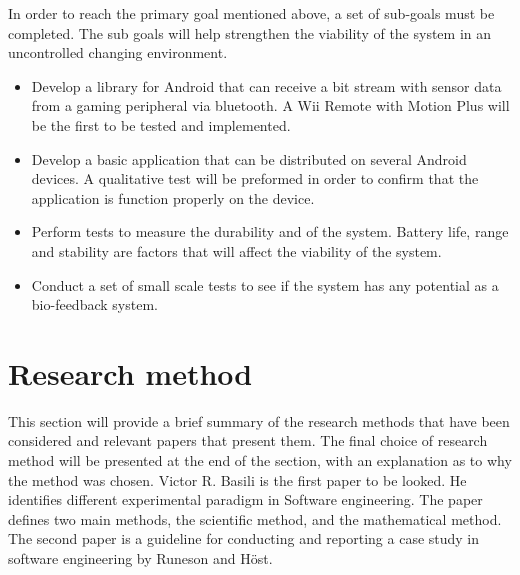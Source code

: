 In order to reach the primary goal mentioned above, a set of sub-goals must be completed. The sub goals will help strengthen the viability of the system in an uncontrolled changing environment.

\begin{itemize}

\item Develop a library for Android that can receive a bit stream with sensor data from a gaming peripheral via bluetooth. A Wii Remote with Motion Plus will be the first to be tested and implemented.

\item Develop a basic application that can be distributed on several Android devices. A qualitative test will be preformed in order to confirm that the application is function properly on the device.

\item Perform tests to measure the durability and of the system. Battery life, range and stability are factors that will affect the viability of the system.

\item Conduct a set of small scale tests to see if the system has any potential as a bio-feedback system.

\end{itemize}


\section{Research method}
This section will provide a brief summary of the research methods that have been considered and relevant papers that present them. The final choice of research method will be presented at the end of the section, with an explanation as to why the method was chosen. Victor R. Basili\cite{paradigm} is the first paper to be looked. He identifies different experimental paradigm in Software engineering. The paper defines two main methods, the scientific method, and the mathematical method. The second paper is a guideline for conducting and reporting a case study in software engineering by Runeson and Höst.


